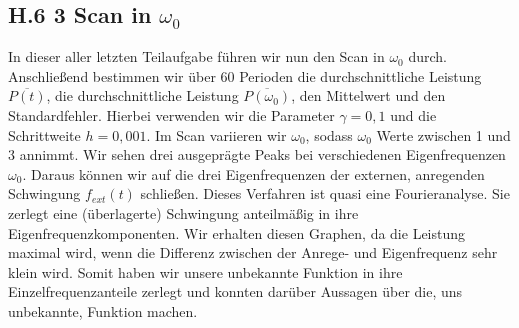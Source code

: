 \documentclass[ngerman]{scrartcl}
\begin{document}
\subsection{H.6 3 Scan in $\omega_0$}
In dieser aller letzten Teilaufgabe führen wir nun den Scan in $\omega_0$ durch. Anschließend bestimmen wir über 60 Perioden  die durchschnittliche Leistung $\overline{P(t)}$, die durchschnittliche Leistung $\overline{P(\omega_0)}$, den Mittelwert und den Standardfehler. Hierbei verwenden wir die Parameter $\gamma=0,1$ und die Schrittweite $h=0,001$. Im Scan variieren wir $\omega_0$, sodass $\omega_0$ Werte zwischen 1 und 3 annimmt.  
Wir sehen drei ausgeprägte Peaks bei verschiedenen Eigenfrequenzen $\omega_0$. Daraus können wir auf die drei Eigenfrequenzen der externen, anregenden Schwingung $f_{ext}(t)$  schließen. Dieses Verfahren ist quasi eine Fourieranalyse. Sie zerlegt eine (überlagerte) Schwingung anteilmäßig in ihre Eigenfrequenzkomponenten. Wir erhalten diesen Graphen, da die Leistung maximal wird, wenn die Differenz zwischen der Anrege- und Eigenfrequenz sehr klein wird. Somit haben wir unsere unbekannte Funktion in ihre Einzelfrequenzanteile zerlegt und konnten darüber Aussagen über die, uns unbekannte, Funktion machen.
\end{document}
